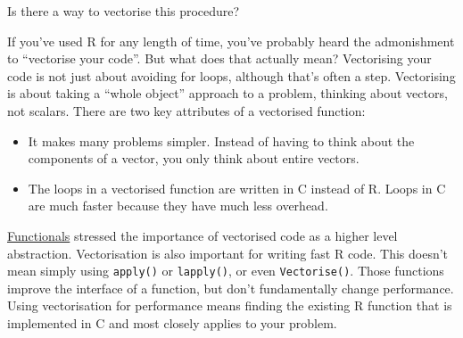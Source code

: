 \begin{enumerate}
\begin{Shaded}
\begin{Highlighting}[]
\StringTok{ }
\StringTok{ }\NormalTok{(}  

\StringTok{ }
  \StringTok{ }\NormalTok{(}\StringTok{ }\NormalTok{)}
  \NormalTok{(q[i, , } \NormalTok{])[}\NormalTok{,}\NormalTok{]}
\NormalTok{\}}
\end{Highlighting}
\end{Shaded}

  Is there a way to vectorise this procedure?
\end{enumerate}


If you've used R for any length of time, you've probably heard the
admonishment to ``vectorise your code''. But what does that actually
mean? Vectorising your code is not just about avoiding for loops,
although that's often a step. Vectorising is about taking a ``whole
object'' approach to a problem, thinking about vectors, not scalars.
There are two key attributes of a vectorised function:

\begin{itemize}
\item
  It makes many problems simpler. Instead of having to think about the
  components of a vector, you only think about entire vectors.
\item
  The loops in a vectorised function are written in C instead of R.
  Loops in C are much faster because they have much less overhead.
\end{itemize}

\hyperref[functionals]{Functionals} stressed the importance of
vectorised code as a higher level abstraction. Vectorisation is also
important for writing fast R code. This doesn't mean simply using
\texttt{apply()} or \texttt{lapply()}, or even \texttt{Vectorise()}.
Those functions improve the interface of a function, but don't
fundamentally change performance. Using vectorisation for performance
means finding the existing R function that is implemented in C and most
closely applies to your problem.

